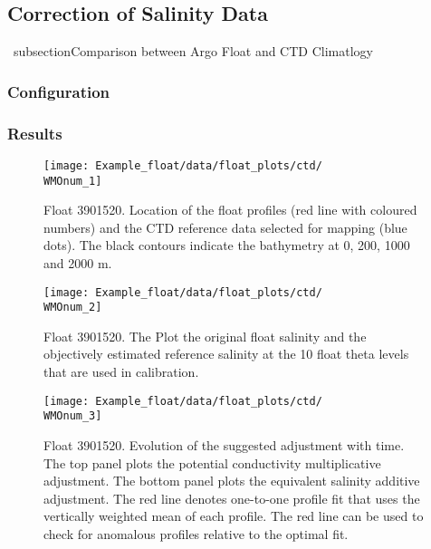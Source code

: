 \documentclass{article}
\newcommand{\WMOnum}{3901520} %
\begin{document}
\begin{flushleft}
\newpage
\section{Correction of Salinity Data}
\
subsection{Comparison between Argo Float and CTD Climatlogy}
\subsubsection{Configuration}
\label{Configuration1}

% 



\subsubsection{Results} \label{results_CTD}
\begin{figure}[H]
    \centering    
    \texttt{[image: Example\_float/data/float\_plots/ctd/\\WMOnum\_1]}
    \caption{Float \WMOnum. Location of the float profiles (red line with coloured numbers) and the CTD reference data selected for mapping (blue dots). The black contours indicate the bathymetry at 0, 200, 1000 and 2000 m.}
    \label{trajectoryCTD}
\end{figure}

\newpage
\begin{figure}[H]
    \centering    
    \texttt{[image: Example\_float/data/float\_plots/ctd/\\WMOnum\_2]}
    \caption{Float \WMOnum. The Plot the original float salinity and the objectively estimated reference salinity at the 10 float theta levels that are used in calibration.}
    \label{uncalibVsSalinity}
\end{figure}

\begin{figure}[H]
    \centering    
    \texttt{[image: Example\_float/data/float\_plots/ctd/\\WMOnum\_3]}
    \caption{Float \WMOnum. Evolution of the suggested adjustment with time. The top panel plots the potential conductivity multiplicative adjustment. The bottom panel plots the equivalent salinity additive adjustment. The red line denotes one-to-one profile fit that uses the vertically weighted mean of each profile. The red line can be used to check for anomalous profiles relative to the optimal fit.}
    \label{SalWithErrors}
\end{figure}


\end{flushleft}
\end{document}
